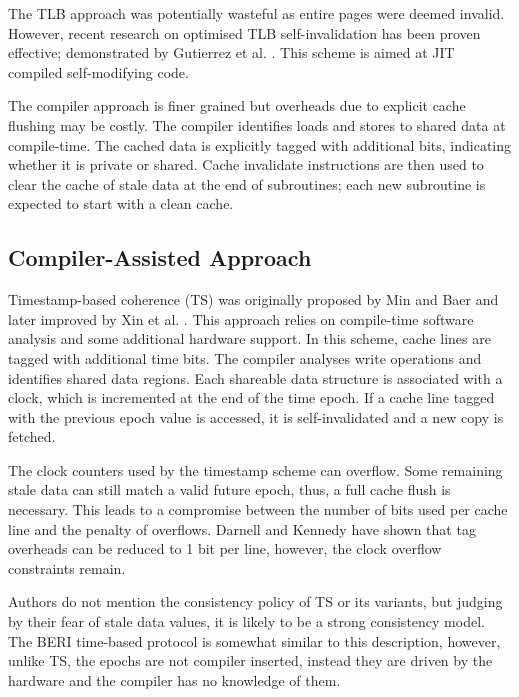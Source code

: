 				The TLB approach was potentially wasteful as entire pages were deemed invalid. However, recent research on optimised TLB self-invalidation has been proven effective; demonstrated by Gutierrez et al. \cite{Gutierrez12}. This scheme is aimed at JIT compiled self-modifying code.
				
				The compiler approach is finer grained but overheads due to explicit cache flushing may be costly. The compiler identifies loads and stores to shared data at compile-time.
				The cached data is explicitly tagged with additional bits, indicating whether it is private or shared. Cache invalidate instructions are then used to clear the cache of stale data at the end of subroutines; each new subroutine is expected to start with a clean cache.
		
			\subsection{Compiler-Assisted Approach}
				Timestamp-based coherence (TS) was originally proposed by Min and Baer \cite{Min92} and later improved by Xin et al. \cite{Xin96}. This approach relies on compile-time software analysis and some additional hardware support. In this scheme, cache lines are tagged with additional time bits. The compiler analyses write operations and identifies shared data regions. 
				Each shareable data structure is associated with a clock, which is incremented at the end of the time epoch. If a cache line tagged with the previous epoch value is accessed, it is self-invalidated and a new copy is fetched.
				
				The clock counters used by the timestamp scheme can overflow. Some remaining stale data can still match a valid future epoch, thus, a full cache flush is necessary. This leads to a compromise between the number of bits used per cache line and the penalty of overflows. Darnell and Kennedy \cite{Darnell93} have shown that tag overheads can be reduced to 1 bit per line, however, the clock overflow constraints remain. 
				
				Authors do not mention the consistency policy of TS or its variants, but judging by their fear of stale data values, it is likely to be a strong consistency model. The BERI time-based protocol is somewhat similar to this description, however, unlike TS, the epochs are not compiler inserted, instead they are driven by the hardware and the compiler has no knowledge of them.
				

